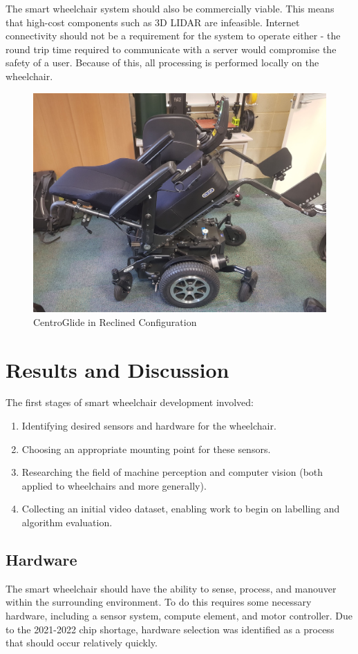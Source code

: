 \documentclass[12pt]{article}
\begin{document}
The smart wheelchair system should also be commercially viable. This means that high-cost
components such as 3D LIDAR are infeasible. Internet connectivity should not be a requirement
for the system to operate either - the round trip time required to communicate with a server
would compromise the safety of a user. Because of this, all processing is performed locally
on the wheelchair.

\begin{figure}
    \centering
    \includegraphics[width=0.8\linewidth]{images/wheelchair_reclined.jpeg}
    \caption{CentroGlide in Reclined Configuration}
    \label{fig:wheelchair_reclined}
\end{figure}

\pagebreak

\section{Results and Discussion}
The first stages of smart wheelchair development involved:
\begin{enumerate}
    \item Identifying desired sensors and hardware for the wheelchair.
    \item Choosing an appropriate mounting point for these sensors.
    \item Researching the field of machine perception and computer vision (both applied to wheelchairs and more generally).
    \item Collecting an initial video dataset, enabling work to begin on labelling and algorithm evaluation.
\end{enumerate}

\subsection{Hardware}
The smart wheelchair should have the ability to sense, process, and manouver within the surrounding environment.
To do this requires some necessary hardware, including a sensor system, compute element, and motor controller.
Due to the 2021-2022 chip shortage, hardware selection was identified as a process that should occur relatively quickly.
\end{document}
